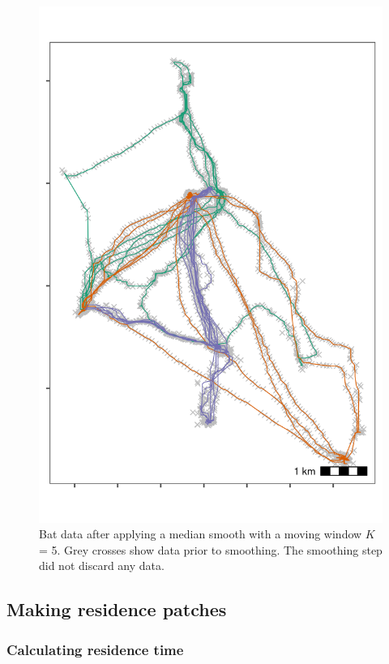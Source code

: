 \documentclass[
]{scrartcl}
\begin{document}
\begin{figure}
\centering
\includegraphics{figures/fig_bat_smooth.png}
\caption{Bat data after applying a median smooth with a moving window \(K\) = 5. Grey crosses show data prior to smoothing. The smoothing step did not discard any data.}
\end{figure}

\hypertarget{making-residence-patches}{%
\subsection{Making residence patches}\label{making-residence-patches}}

\hypertarget{calculating-residence-time}{%
\subsubsection{Calculating residence time}\label{calculating-residence-time}}
\end{document}
